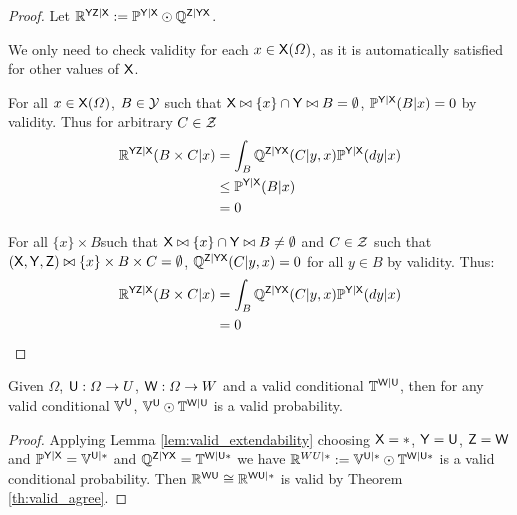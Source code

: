 \begin{proof}
Let $\mathbb{R}^{\mathsf{YZ}|\mathsf{X}}:=\mathbb{P}^{\mathsf{Y}|\mathsf{X}}\odot \mathbb{Q}^{\mathsf{Z}|\mathsf{Y}\mathsf{X}}$.

We only need to check validity for each $x\in \mathsf{X}(\Omega)$, as it is automatically satisfied for other values of $\mathsf{X}$.

For all $x\in \mathsf{X}(\Omega)$, $B\in \mathcal{Y}$ such that $\mathsf{X}\bowtie \{x\}\cap\mathsf{Y}\bowtie B=\emptyset$, $\mathbb{P}^{\mathsf{Y}|\mathsf{X}}(B|x)=0$ by validity. Thus for arbitrary $C\in \mathcal{Z}$
\begin{align}
    \mathbb{R}^{\mathsf{YZ}|\mathsf{X}}(B\times C|x) &= \int_B \mathbb{Q}^{\mathsf{Z}|\mathsf{YX}}(C|y,x)\mathbb{P}^{\mathsf{Y}|\mathsf{X}}(dy|x)\\
                                  &\leq \mathbb{P}^{\mathsf{Y}|\mathsf{X}}(B|x)\\
                                  &=0
\end{align}

For all $\{x\}\times B$such that $\mathsf{X}\bowtie \{x\}\cap\mathsf{Y}\bowtie B\neq \emptyset$ and $C\in \mathcal{Z}$ such that $(\mathsf{X},\mathsf{Y},\mathsf{Z})\bowtie \{x\}\times B\times C=\emptyset$, $\mathbb{Q}^{\mathsf{Z}|\mathsf{YX}}(C|y,x)=0$ for all $y\in B$ by validity. Thus:
\begin{align}
    \mathbb{R}^{\mathsf{YZ}|\mathsf{X}}(B\times C|x) &= \int_B \mathbb{Q}^{\mathsf{Z}|\mathsf{YX}}(C|y,x)\mathbb{P}^{\mathsf{Y}|\mathsf{X}}(dy|x)\\
                                            &=0
\end{align}
\end{proof}

\begin{corollary}\label{corr:valid_extend_order1}
Given $\Omega$, $\mathsf{U}:\Omega\to U$, $\mathsf{W}:\Omega\to W$ and a valid conditional $\mathbb{T}^{\mathsf{W}|\mathsf{U}}$, then for any valid conditional $\mathbb{V}^{\mathsf{U}}$, $\mathbb{V}^{\mathsf{U}}\odot \mathbb{T}^{\mathsf{W}|\mathsf{U}}$ is a valid probability.
\end{corollary}

\begin{proof}
Applying Lemma \ref{lem:valid_extendability} choosing $\mathsf{X}=*$, $\mathsf{Y}=\mathsf{U}$, $\mathsf{Z}=\mathsf{W}$ and $\mathbb{P}^{\mathsf{Y}|\mathsf{X}}=\mathbb{V}^{\mathsf{U}|*}$ and $\mathbb{Q}^{\mathsf{Z}|\mathsf{YX}}=\mathbb{T}^{\mathsf{W}|\mathsf{U*}}$ we have $\mathbb{R}^{WU|*}:=\mathbb{V}^{\mathsf{U}|*}\odot \mathbb{T}^{\mathsf{W}|\mathsf{U}*}$ is a valid conditional probability. Then $\mathbb{R}^{\mathsf{WU}}\cong \mathbb{R}^{\mathsf{WU}|*}$ is valid by Theorem \ref{th:valid_agree}.
\end{proof}

